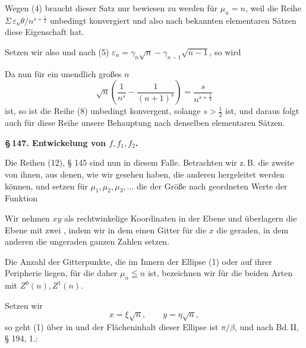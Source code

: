
Wegen (4) braucht dieser Satz nur bewiesen zu werden für
$\mu_n = n$, weil die Reihe $\Sigma\, \varepsilon_n\theta/n^{s+\frac{1}{2}}$ unbedingt konvergiert und
also nach bekannten elementaren Sätzen diese Eigenschaft hat.

Setzen wir also
und nach (5) $\varepsilon_n = \gamma_n\sqrt{n} - \gamma_{n-1}\sqrt{n-1}$, so wird

Da nun für ein unendlich großes $n$
\[
\sqrt{n}\left(\frac{1}{n^s} - \frac{1}{(n+1)^s}\right) = \frac{s}{n^{s+\frac{1}{2}}}
\]
ist, so ist die Reihe (8) unbedingt konvergent, solange $s > \frac{1}{2}$
ist, und daraus folgt auch für diese Reihe unsere Behauptung
nach denselben elementaren Sätzen.

\begin{center}\textbf{\S\,147. Entwickelung von $f, f_1, f_2$.}\end{center}

Die Reihen (12), § 145 sind nun in diesem Falle. Betrachten
wir z.\,B. die zweite von ihnen, aus denen, wie wir gesehen
haben, die anderen hergeleitet werden können, und setzen für
$\mu_1, \mu_2, \mu_3, \ldots$ die der Größe nach geordneten Werte der Funktion

Wir nehmen $xy$ als rechtwinkelige Koordinaten in der Ebene
und überlagern die Ebene mit zwei , indem wir in dem
einen Gitter für die $x$ die geraden, in dem anderen die ungeraden
ganzen Zahlen setzen.

Die Anzahl der Gitterpunkte, die im Innern der Ellipse (1)
oder auf ihrer Peripherie liegen, für die daher $\mu_n \leqq n$ ist, bezeichnen wir für die beiden Arten mit $Z^0(n), Z^1(n)$.

Setzen wir
\[
x = \xi\sqrt{n}, \qquad y = \eta\sqrt{n},
\]
so geht (1) über in
und der Flächeninhalt dieser Ellipse ist $\pi/\beta$, und nach Bd.\,II,
§ 194, 1.:
